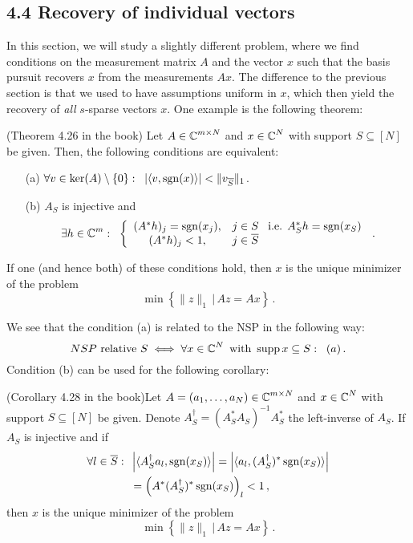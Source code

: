 \documentclass[a4paper]{article}
\begin{document}
\subsection*{4.4  Recovery of individual vectors}

In this section, we will study a slightly different problem, where we find conditions on the measurement matrix \(A \) and the vector \(x\) such that the basis pursuit recovers \(x\) from the measurements \(Ax\). The difference to the previous section is that we used to have assumptions uniform in \(x\), which then yield the recovery of \emph{all} \(s\)-sparse vectors \(x\). One example is the following theorem: \begin{Satz*}
		{(Theorem 4.26 in the book)}{} Let \(A\in\operatorname{\mathbb C}^{m\times N}\) and \(x\in\operatorname{\mathbb C}^N\) with support \(S\subseteq[N]\) be given. Then, the following conditions are equivalent:
		\begin{itemize}
			\item[(a)] \(\forall v\in \ker(A)\setminus\{0\}:\;\;|\langle v,\operatorname{\mathrm{sgn}}(x)\rangle|< \|v_{\overline S}\|_1\).
			\item[(b)] \(A_S\) is injective and 
			\[\exists h\in \operatorname{\mathbb C}^m:\;\;\left\{\begin{array}{cl}
				(A^*h)_j=\operatorname{\mathrm{sgn}}(x_j),&j\in S\;\;\;\text{i.e. }A^*_Sh=\operatorname{\mathrm{sgn}}(x_S)\\
				(A^*h)_j<1,&j\in \overline S
			\end{array}\right.\,.\]
			\end{itemize}
			If one (and hence both) of these conditions hold, then \(x\) is the unique minimizer of the problem
			\[\min\left\{\|z\|_1\,\big|\,Az=Ax\right\}\,.\]
	\end{Satz*}

    We see that the condition (a) is related to the NSP in the following way: 
    \[NSP\text{ relative }S\iff \forall x\in \operatorname{\mathbb C}^N\text{ with }\operatorname{\textrm{supp}} x\subseteq S:\;\;(a)\,.\]
    Condition (b) can be used for the following corollary:

    \begin{Kor*}
			{(Corollary 4.28 in the book)}{}Let \(A=(a_1,\ldots,a_N)\in\operatorname{\mathbb C}^{m\times N}\) and \(x\in\operatorname{\mathbb C}^N\) with support \(S\subseteq[N]\) be given. Denote \(A_S^{\dagger}=(A^*_SA_S)^{-1}A^*_S\) the left-inverse of \(A_S\). If \(A_S\) is injective and if 
			\begin{align*}
			\forall l\in \overline S:\;\;&\left|\langle A_S^{\dagger}a_l,\operatorname{\mathrm{sgn}}(x_S)\rangle\right|=\left|\langle a_l,(A_S^{\dagger})^*\operatorname{\mathrm{sgn}}(x_S)\rangle\right|\\
			&=\left(A^*(A_S^{\dagger})^*\operatorname{\mathrm{sgn}}(x_S)\right)_l<1\,,
			\end{align*}
			then \(x\) is the unique minimizer of the problem
			\[\min\left\{\|z\|_1\,\big|\,Az=Ax\right\}\,.\]
		\end{Kor*}
\end{document}
